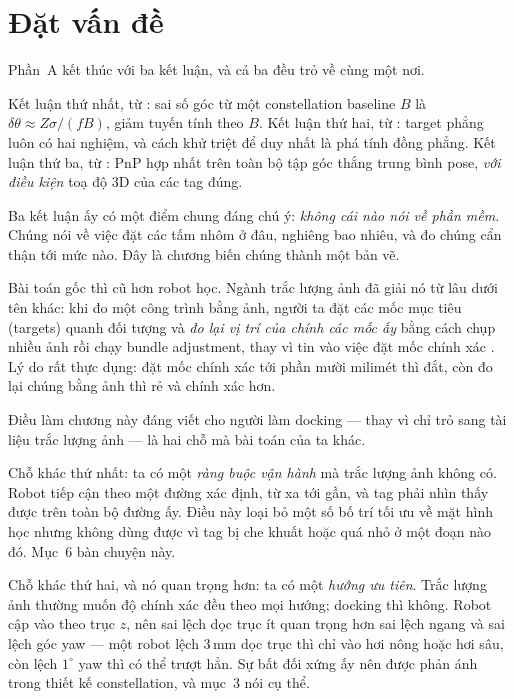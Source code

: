 \documentclass[../../marker.tex]{subfiles}
\begin{document}
\section{Đặt vấn đề}

Phần~A kết thúc với ba kết luận, và cả ba đều trỏ về cùng một nơi.

Kết luận thứ nhất, từ : sai số góc từ một constellation baseline \(B\) là \(\delta\theta \approx Z\sigma/(fB)\), giảm tuyến tính theo \(B\). Kết luận thứ hai, từ : target phẳng luôn có hai nghiệm, và cách khử triệt để duy nhất là phá tính đồng phẳng. Kết luận thứ ba, từ : PnP hợp nhất trên toàn bộ tập góc thắng trung bình pose, \emph{với điều kiện} toạ độ 3D của các tag đúng.

Ba kết luận ấy có một điểm chung đáng chú ý: \emph{không cái nào nói về phần mềm}. Chúng nói về việc đặt các tấm nhôm ở đâu, nghiêng bao nhiêu, và đo chúng cẩn thận tới mức nào. Đây là chương biến chúng thành một bản vẽ.

Bài toán gốc thì cũ hơn robot học. Ngành trắc lượng ảnh đã giải nó từ lâu dưới tên khác: khi đo một công trình bằng ảnh, người ta đặt các mốc mục tiêu (targets) quanh đối tượng và \emph{đo lại vị trí của chính các mốc ấy} bằng cách chụp nhiều ảnh rồi chạy bundle adjustment, thay vì tin vào việc đặt mốc chính xác \cite{triggs2000bundle}. Lý do rất thực dụng: đặt mốc chính xác tới phần mười milimét thì đắt, còn đo lại chúng bằng ảnh thì rẻ và chính xác hơn.

Điều làm chương này đáng viết cho người làm docking --- thay vì chỉ trỏ sang tài liệu trắc lượng ảnh --- là hai chỗ mà bài toán của ta khác.

Chỗ khác thứ nhất: ta có một \emph{ràng buộc vận hành} mà trắc lượng ảnh không có. Robot tiếp cận theo một đường xác định, từ xa tới gần, và tag phải nhìn thấy được trên toàn bộ đường ấy. Điều này loại bỏ một số bố trí tối ưu về mặt hình học nhưng không dùng được vì tag bị che khuất hoặc quá nhỏ ở một đoạn nào đó. Mục~6 bàn chuyện này.

Chỗ khác thứ hai, và nó quan trọng hơn: ta có một \emph{hướng ưu tiên}. Trắc lượng ảnh thường muốn độ chính xác đều theo mọi hướng; docking thì không. Robot cập vào theo trục \(z\), nên sai lệch dọc trục ít quan trọng hơn sai lệch ngang và sai lệch góc yaw --- một robot lệch 3\,mm dọc trục thì chỉ vào hơi nông hoặc hơi sâu, còn lệch \(1^\circ\) yaw thì có thể trượt hẳn. Sự bất đối xứng ấy nên được phản ánh trong thiết kế constellation, và mục~3 nói cụ thể.
\end{document}

